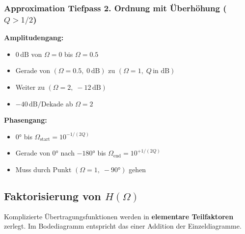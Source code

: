 \documentclass[a4paper,12pt]{article}
\begin{document}
	\subsubsection*{Approximation Tiefpass 2. Ordnung mit Überhöhung ($Q > 1/2$)}
	\textbf{Amplitudengang:}
	\begin{itemize}
		\item $0\,\text{dB}$ von $\Omega=0$ bis $\Omega=0.5$
		\item Gerade von $(\Omega=0.5,\; 0\,\text{dB})$ zu $(\Omega=1,\; Q\,\text{in dB})$
		\item Weiter zu $(\Omega=2,\; -12\,\text{dB})$
		\item $-40\,\text{dB/Dekade}$ ab $\Omega=2$
	\end{itemize}
	\textbf{Phasengang:}
	\begin{itemize}
		\item $0°$ bis $\Omega_\text{start} = 10^{-1/(2Q)}$
		\item Gerade von $0°$ nach $-180°$ bis $\Omega_\text{end} = 10^{+1/(2Q)}$
		\item Muss durch Punkt $(\Omega=1,\; -90°)$ gehen
	\end{itemize}
	
	
	\subsection{Faktorisierung von $H(\Omega)$}
	
	Komplizierte Übertragungsfunktionen werden in \textbf{elementare Teilfaktoren}
	zerlegt. Im Bodediagramm entspricht das einer Addition der Einzeldiagramme.
	
\end{document}
